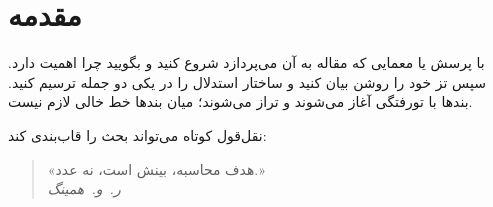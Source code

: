 \section{مقدمه}

با پرسش یا معمایی که مقاله به آن می‌پردازد شروع کنید و بگویید چرا اهمیت دارد. سپس تز خود را روشن بیان کنید
و ساختار استدلال را در یکی دو جمله ترسیم کنید. بندها با تورفتگی آغاز می‌شوند و تراز می‌شوند؛ میان بندها
خط خالی لازم نیست.

نقل‌قول کوتاه می‌تواند بحث را قاب‌بندی کند:
\begin{quote}
  «هدف محاسبه، بینش است، نه عدد.»\\
  \hfill\emph{ر.~و.~همینگ}
\end{quote}
